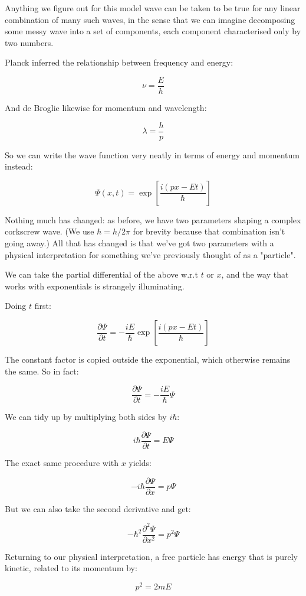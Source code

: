 Anything we figure out for this model wave can be taken to be true for any linear combination of many such waves, in the sense that we can imagine decomposing some messy wave into a set of components, each component characterised only by two numbers.

Planck inferred the relationship between frequency and energy:

$$\nu = \frac{E}{h}$$

And de Broglie likewise for momentum and wavelength:

$$\lambda = \frac{h}{p}$$

So we can write the wave function very neatly in terms of energy and momentum instead:

$$
\Psi(x, t) = \exp \left[ {\frac{i(px - Et)}{\hbar}} \right]
$$

Nothing much has changed: as before, we have two parameters shaping a complex corkscrew wave. (We use $\hbar = h/2\pi$ for brevity because that combination isn't going away.) All that has changed is that we've got two parameters with a physical interpretation for something we've previously thought of as a "particle".

We can take the partial differential of the above w.r.t $t$ or $x$, and the way that works with exponentials is strangely illuminating.

Doing $t$ first:

$$
\frac{\partial \Psi}{\partial t}
=
-\frac{iE}{\hbar}
\exp \left[ {\frac{i(px - Et)}{\hbar}} \right]
$$

The constant factor is copied outside the exponential, which otherwise remains the same. So in fact:

$$
\frac{\partial \Psi}{\partial t}
=
-\frac{iE}{\hbar}
\Psi
$$

We can tidy up by multiplying both sides by $i\hbar$:

$$
i\hbar \frac{\partial \Psi}{\partial t}
= E \Psi
$$

The exact same procedure with $x$ yields:

$$
- i\hbar \frac{\partial \Psi}{\partial x}
= p \Psi
$$

But we can also take the second derivative and get:

$$
- \hbar^2 \frac{\partial^2 \Psi}{\partial x^2}
= p^2 \Psi
$$

Returning to our physical interpretation, a free particle has energy that is purely kinetic, related to its momentum by:

$$
p^2 = 2m E
$$

